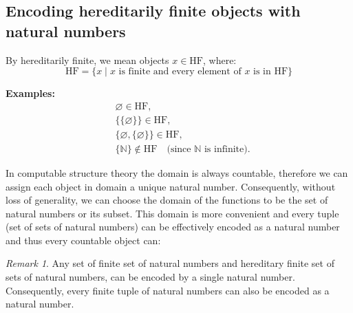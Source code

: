 \documentclass{pracalicmgr2025}
\theoremstyle{plain}            %
\theoremstyle{remark}           %
\newtheorem{remark}[theorem]{Remark}
\theoremstyle{definition}       %
\begin{document}
\subsection{Encoding hereditarily finite objects with natural numbers}

By hereditarily finite, we mean objects $x \in \mathrm{HF}$, where:
$$ \mathrm{HF} = \{ x \mid x \text{ is finite and every element of } x \text{ is in } \mathrm{HF} \} $$

\textbf{Examples:}
\begin{align*}
&\varnothing \in \mathrm{HF}, \\
&\{\{\varnothing\}\} \in \mathrm{HF}, \\
&\{\varnothing, \{\varnothing\}\} \in \mathrm{HF}, \\
&\{ \mathbb{N} \} \notin \mathrm{HF} \quad \text{(since $\mathbb{N}$ is infinite).}
\end{align*}

In computable structure theory the domain is always countable, therefore we can assign each object in domain a unique natural number. Consequently, without loss of generality, we can choose the domain of the functions to be the set of natural numbers or its subset. This domain is more convenient and every tuple (set of sets of natural numbers) can be effectively encoded as a natural number and thus every countable object can: 
\begin{remark}
    Any set of finite set of natural numbers and hereditary finite set of sets of natural numbers, can be encoded by a single natural number. Consequently, every finite tuple of natural numbers can also be encoded as a natural number.
\end{remark}
\end{document}

